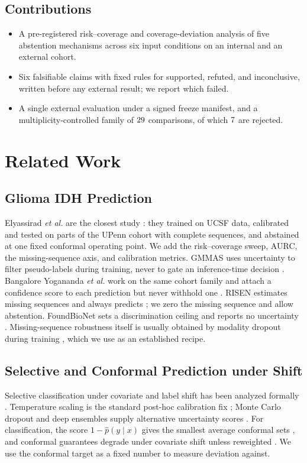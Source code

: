 \documentclass[conference]{IEEEtran}
\begin{document}
\subsection{Contributions}
\begin{itemize}
\item A pre-registered risk--coverage and coverage-deviation analysis of five abstention mechanisms across six input conditions on an internal and an external cohort.
\item Six falsifiable claims with fixed rules for supported, refuted, and inconclusive, written before any external result; we report which failed.
\item A single external evaluation under a signed freeze manifest, and a multiplicity-controlled family of $29$ comparisons, of which $7$ are rejected.
\end{itemize}

\section{Related Work}

\subsection{Glioma IDH Prediction}
Elyassirad \emph{et al.} are the closest study \cite{elyassirad2026}: they trained on UCSF data, calibrated and tested on parts of the UPenn cohort with complete sequences, and abstained at one fixed conformal operating point. We add the risk--coverage sweep, AURC, the missing-sequence axis, and calibration metrics. GMMAS uses uncertainty to filter pseudo-labels during training, never to gate an inference-time decision \cite{liu2026gmmas}. Bangalore Yogananda \emph{et al.} work on the same cohort family and attach a confidence score to each prediction but never withhold one \cite{yogananda2025}. RISEN estimates missing sequences and always predicts \cite{liang2026risen}; we zero the missing sequence and allow abstention. FoundBioNet sets a discrimination ceiling and reports no uncertainty \cite{farahani2025}. Missing-sequence robustness itself is usually obtained by modality dropout during training \cite{neverova2016}, which we use as an established recipe.

\subsection{Selective and Conformal Prediction under Shift}
Selective classification under covariate and label shift has been analyzed formally \cite{liang2024selective}. Temperature scaling is the standard post-hoc calibration fix \cite{guo2017}; Monte Carlo dropout and deep ensembles supply alternative uncertainty scores \cite{gal2016,lakshminarayanan2017}. For classification, the score $1-\hat p(y\mid x)$ gives the smallest average conformal sets \cite{sadinle2019}, and conformal guarantees degrade under covariate shift unless reweighted \cite{tibshirani2019,barber2023}. We use the conformal target as a fixed number to measure deviation against.
\end{document}

